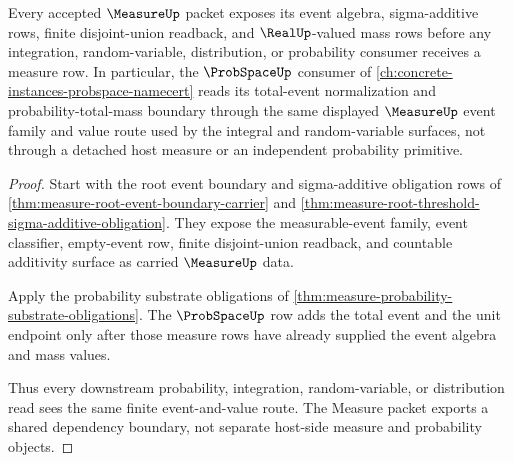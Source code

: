 \begin{theorem}
\label{thm:measure-probability-sigma-dependency}
Every accepted $\MeasureUp$ packet exposes its event algebra, sigma-additive rows, finite disjoint-union readback, and $\RealUp$-valued mass rows before any integration, random-variable, distribution, or probability consumer receives a measure row. In particular, the $\ProbSpaceUp$ consumer of \autoref{ch:concrete-instances-probspace-namecert} reads its total-event normalization and probability-total-mass boundary through the same displayed $\MeasureUp$ event family and value route used by the integral and random-variable surfaces, not through a detached host measure or an independent probability primitive.
\end{theorem}
\begin{proof}
Start with the root event boundary and sigma-additive obligation rows of \autoref{thm:measure-root-event-boundary-carrier} and \autoref{thm:measure-root-threshold-sigma-additive-obligation}. They expose the measurable-event family, event classifier, empty-event row, finite disjoint-union readback, and countable additivity surface as carried $\MeasureUp$ data.

Apply the probability substrate obligations of \autoref{thm:measure-probability-substrate-obligations}. The $\ProbSpaceUp$ row adds the total event and the unit endpoint only after those measure rows have already supplied the event algebra and mass values.

Thus every downstream probability, integration, random-variable, or distribution read sees the same finite event-and-value route. The Measure packet exports a shared dependency boundary, not separate host-side measure and probability objects.
\end{proof}

